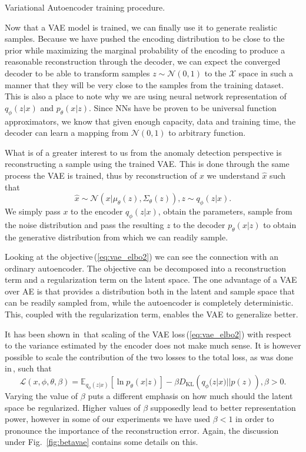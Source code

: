 \begin{algorithm}
\caption{Variational Autoencoder training procedure.}
\label{alg:vae_train}
\end{algorithm}

Now that a VAE model is trained, we can finally use it to generate
realistic samples. Because we have pushed the encoding distribution
to be close to the prior while maximizing the marginal probability
of the encoding to produce a reasonable reconstruction through the
decoder, we can expect the converged decoder to be able to transform
samples $z\sim\mathcal{N}(0,1)$ to the $\mathcal{X}$ space in such
a manner that they will be very close to the samples from the training
dataset. This is also a place to note why we are using neural network
representation of $q_{\phi}(z|x)$ and $p_{\theta}(x|z)$. Since NNs
have be proven to be universal function approximators, we know that
given enough capacity, data and training time, the decoder can learn
a mapping from $\mathcal{N}(0,1)$ to arbitrary function.

What is of a greater interest to us from the anomaly detection perspective
is reconstructing a sample using the trained VAE. This is done through
the same process the VAE is trained, thus by reconstruction of $x$
we understand $\hat{x}$ such that
\begin{equation}
\hat{x}\sim\mathcal{N}(x|\mu_{\theta}(z),\Sigma_{\theta}(z)),z\sim q_{\phi}(z|x).
\end{equation}
We simply pass $x$ to the encoder $q_{\phi}(z|x)$, obtain the parameters,
sample from the noise distribution and pass the resulting $z$ to
the decoder $p_{\theta}(x|z)$ to obtain the generative distribution
from which we can readily sample.

Looking at the objective\,(\ref{eq:vae_elbo2}) we can see the connection
with an ordinary autoencoder. The objective can be decomposed into
a reconstruction term and a regularization term on the latent space.
The one advantage of a VAE over AE is that provides a distribution
both in the latent and sample space that can be readily sampled from,
while the autoencoder is completely deterministic. This, coupled with
the regularization term, enables the VAE to generalize better.

It has been shown in\,\cite{doersch2016tutorial} that scaling of
the VAE loss\,(\ref{eq:vae_elbo2}) with respect to the variance
estimated by the encoder does not make much sense. It is however possible
to scale the contribution of the two losses to the total loss, as
was done in\,\cite{higgins2017beta}, such that
\begin{equation}
\mathcal{L}(x,\phi,\theta,\beta)=\mathbb{E}_{q_{\phi}(z|x)}\left[\ln p_{\theta}(x|z)\right]-\beta D_{\text{KL}}\left(q_{\phi}(z|x)||p(z)\right),\beta>0.\label{eq:betavae}
\end{equation}
Varying the value of $\beta$ puts a different emphasis on how much
should the latent space be regularized. Higher values of $\beta$
supposedly lead to better representation power, however in some of
our experiments we have used $\beta<1$ in order to pronounce the
importance of the reconstruction error. Again, the discussion under
Fig.~\ref{fig:betavae} contains some details on this.

